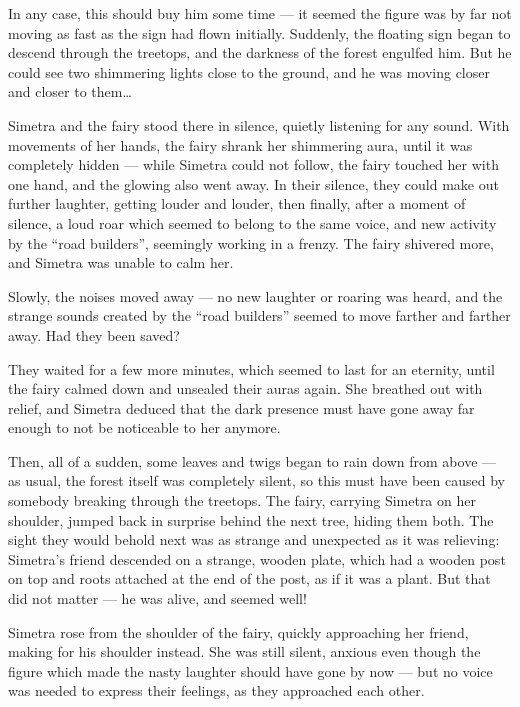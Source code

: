 In any case, this should buy him some time --- it seemed the figure was by far not moving as fast as the sign had flown initially. Suddenly, the floating sign began to descend through the treetops, and the darkness of the forest engulfed him. But he could see two shimmering lights close to the ground, and he was moving closer and closer to them\dots{}

\froufrou{}

Simetra and the fairy stood there in silence, quietly listening for any sound. With movements of her hands, the fairy shrank her shimmering aura, until it was completely hidden --- while Simetra could not follow, the fairy touched her with one hand, and the glowing also went away. In their silence, they could make out further laughter, getting louder and louder, then finally, after a moment of silence, a loud roar which seemed to belong to the same voice, and new activity by the \enquote{road builders}, seemingly working in a frenzy. The fairy shivered more, and Simetra was unable to calm her.

Slowly, the noises moved away --- no new laughter or roaring was heard, and the strange sounds created by the \enquote{road builders} seemed to move farther and farther away. Had they been saved?

They waited for a few more minutes, which seemed to last for an eternity, until the fairy calmed down and unsealed their auras again. She breathed out with relief, and Simetra deduced that the dark presence must have gone away far enough to not be noticeable to her anymore.

Then, all of a sudden, some leaves and twigs began to rain down from above --- as usual, the forest itself was completely silent, so this must have been caused by somebody breaking through the treetops. The fairy, carrying Simetra on her shoulder, jumped back in surprise behind the next tree, hiding them both. The sight they would behold next was as strange and unexpected as it was relieving: Simetra's friend descended on a strange, wooden plate, which had a wooden post on top and roots attached at the end of the post, as if it was a plant. But that did not matter --- he was alive, and seemed well!

Simetra rose from the shoulder of the fairy, quickly approaching her friend, making for his shoulder instead. She was still silent, anxious even though the figure which made the nasty laughter should have gone by now --- but no voice was needed to express their feelings, as they approached each other.

